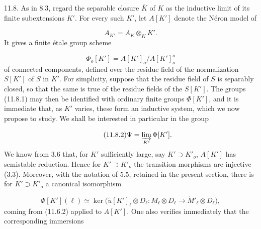 
11.8. As in 8.3, regard the separable closure $\overline K$ of $K$ as the
inductive limit of its finite subextensions $K'$. For every such $K'$, let
$A[K']$ denote the N\'{e}ron model of

\begin{equation*}
A_{K'}=A_K\otimes_K K'.
\end{equation*}
It gives a finite \'{e}tale group scheme

\begin{equation}\tag{11.8.1}
\Phi_o[K']=A[K']_o/A[K']_o^o
\end{equation}
of connected components, defined over the residue field of the normalization
$S[K']$ of $S$ in $K'$. For simplicity, suppose that the residue field of
$S$ is separably closed, so that the same is true of the residue fields of
the $S[K']$. The groups (11.8.1) may then be identified with ordinary finite
groups $\Phi[K']$, and it is immediate that, as $K'$ varies, these form an
inductive system, which we now propose to study. We shall be interested in
particular in the group

\begin{equation}\tag{11.8.2}
\Psi=\varinjlim_{K'}\Phi[K'].
\end{equation}
We know from 3.6 that, for $K'$ sufficiently large, say
$K'\supset K'_o$, $A[K']$ has semistable reduction. Hence for
$K'\supset K'_o$ the transition morphisms are injective (3.3). Moreover,
with the notation of 5.5, retained in the present section, there is for
$K'\supset K'_o$ a canonical isomorphism

\begin{equation}\tag{11.8.3}
\Phi[K'](\ell)\simeq
\ker\bigl(\widetilde u[K']_\ell\otimes D_\ell:
 M_\ell\otimes D_\ell\longrightarrow
 \check M'_\ell\otimes D_\ell\bigr),
\end{equation}
coming from (11.6.2) applied to $A[K']$. One also verifies immediately that
the corresponding immersions

